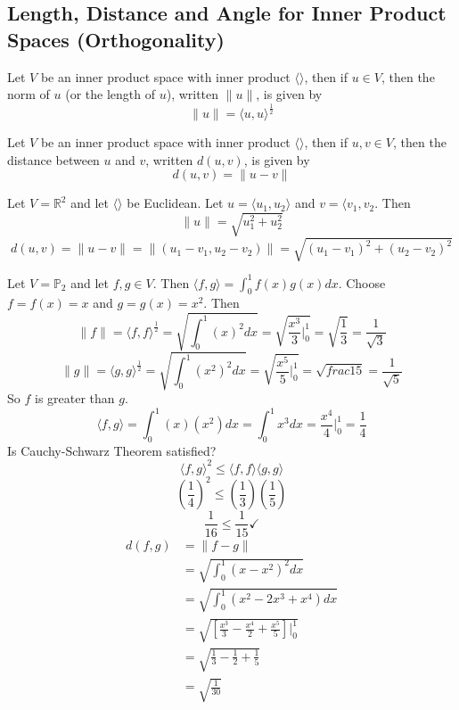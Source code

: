 \documentclass[12pt]{article}
\begin{document}
\subsection{Length, Distance and Angle for Inner Product Spaces (Orthogonality)}
\begin{definition} Let $V$ be an inner product space with inner product $\langle \rangle$, then if $u \in V$, then the norm of $u$ (or the length of $u$), written $\|u\|$, is given by $$\|u\| = \langle u, u \rangle^\frac{1}{2}$$ \end{definition} 
\begin{definition} Let $V$ be an inner product space with inner product $\langle \rangle$, then if $u, v \in V$, then the distance between $u$ and $v$, written $d(u, v)$, is given by $$d(u, v) = \|u - v\|$$ \end{definition} 
\begin{example} Let $V = \mathbb{R}^2$ and let $\langle \rangle$ be Euclidean. Let $u = \langle u_1, u_2 \rangle$ and $v = \langle v_1, v_2$. Then $$\|u\| = \sqrt{u_1^2 + u_2^2} $$ $$d(u, v) = \| u - v \| = \|(u_1 - v_1, u_2 - v_2) \| = \sqrt{(u_1 - v_1)^2 + (u_2 - v_2)^2} $$ \end{example} 
\begin{example} Let $V = \mathbb{P}_2$ and let $f, g \in V$. Then $\langle f, g \rangle = \int_0^1 f(x)g(x)dx $. Choose $f = f(x) = x$ and $g = g(x) = x^2$. Then 
$$\|f\| = \langle f, f \rangle^\frac{1}{2} = \sqrt{\int_0^1 (x)^2dx} = \sqrt{\frac{x^3}{3}\Big|_0^1} = \sqrt{\frac{1}{3}} = \frac{1}{\sqrt{3}} $$ 
$$\|g\| = \langle g, g \rangle^\frac{1}{2} = \sqrt{\int_0^1 (x^2)^2dx} = \sqrt{\frac{x^5}{5}\Big|_0^1} = \sqrt{frac{1}{5}} = \frac{1}{\sqrt{5}} $$ 
So $f$ is greater than $g$. 
$$\langle f, g \rangle = \int_0^1 (x)(x^2)dx = \int_0^1 x^3dx = \frac{x^4}{4}\Big|_0^1 = \frac{1}{4}$$ 
Is Cauchy-Schwarz Theorem satisfied? $$\langle f, g \rangle^2 \leq \langle f, f \rangle \langle g, g \rangle $$ $$ (\frac{1}{4})^2 \leq (\frac{1}{3})(\frac{1}{5}) $$ $$ \frac{1}{16} \leq \frac{1}{15} \checkmark $$ $$\begin{aligned} d(f, g) &= \|f - g \| \\ &= \sqrt{\int_0^1 (x - x^2)^2 dx} \\ &= \sqrt{\int_0^1 (x^2 - 2x^3 + x^4) dx} \\ &= \sqrt{[\frac{x^3}{3} - \frac{x^4}{2} + \frac{x^5}{5}]\Big|_0^1} \\ &= \sqrt{\frac{1}{3} - \frac{1}{2} + \frac{1}{5}} \\&= \sqrt{\frac{1}{30}} \end{aligned} $$ \end{example} 
\end{document}
